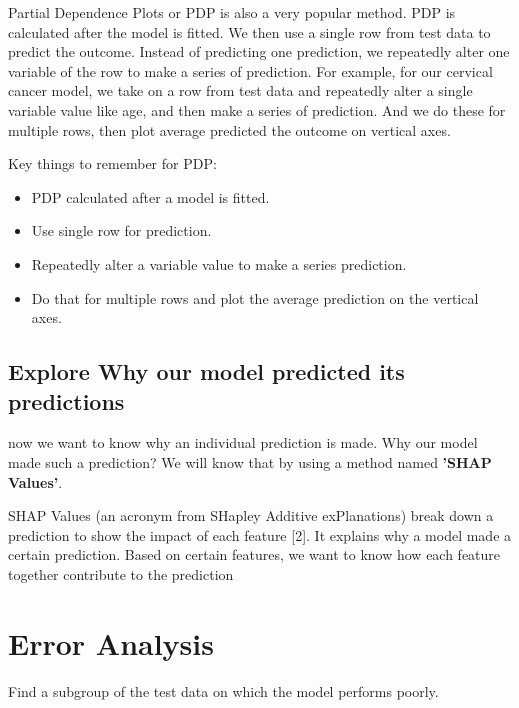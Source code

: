 \documentclass[5 pt]{article}
\begin{document}
Partial Dependence Plots or PDP is also a very popular method. PDP is calculated after the model is fitted. We then use a single row from test data to predict the outcome. Instead of predicting one prediction, we repeatedly alter one variable of the row to make a series of prediction. For example, for our cervical cancer model, we take on a row from test data and repeatedly alter a single variable value like age, and then make a series of prediction. And we do these for multiple rows, then plot average predicted the outcome on vertical axes.


Key things to remember for PDP:
\begin{itemize}
\item PDP calculated after a model is fitted.
\item Use single row for prediction.
\item Repeatedly alter a variable value to make a series prediction.
\item Do that for multiple rows and plot the average prediction on the vertical axes.
\end{itemize}

\subsection{Explore Why our model predicted its predictions}
now we want to know why an individual prediction is made. Why our model made such a prediction? We will know that by using a method named \textbf{'SHAP Values'}.


SHAP Values (an acronym from SHapley Additive exPlanations) break down a prediction to show the impact of each feature [2]. It explains why a model made a certain prediction.  Based on certain features, we want to know how each feature together contribute to the prediction



\section{Error Analysis}

 Find a subgroup of the test data on which the model performs poorly.\\




	
\end{document}
